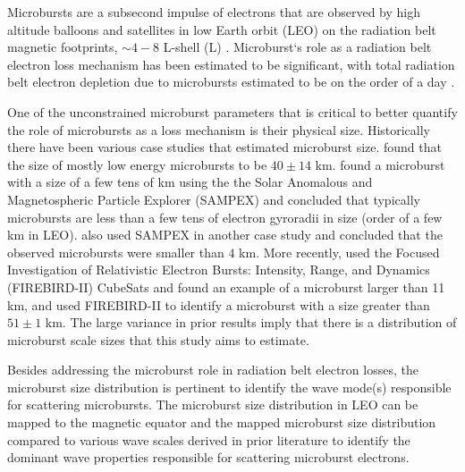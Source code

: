 \documentclass[draft]{agujournal2019}
\begin{document}
Microbursts are a subsecond impulse of electrons that are observed by high altitude balloons and satellites in low Earth orbit (LEO) on the radiation belt magnetic footprints, $\sim 4 - 8$ L-shell (L) \cite{Anderson1964, Parks1967, Lorentzen2001a, Lorentzen2001b, O'Brien2003, Woodger2015, Crew2016, Breneman2017, Mozer2018, Greeley2019}. Microburst`s role as a radiation belt electron loss mechanism has been estimated to be significant, with total radiation belt electron depletion due to microbursts estimated to be on the order of a day \cite{Lorentzen2001b, O'Brien2004, Thorne2005, Breneman2017}. 

One of the unconstrained microburst parameters that is critical to better quantify the role of microbursts as a loss mechanism is their physical size. Historically there have been various case studies that estimated microburst size.  found that the size of mostly low energy microbursts to be $40 \pm 14$ km.  found a microburst with a size of a few tens of km using the the Solar Anomalous and Magnetospheric Particle Explorer (SAMPEX) and concluded that typically microbursts are less than a few tens of electron gyroradii in size (order of a few km in LEO).  also used SAMPEX in another case study and concluded that the observed microbursts were smaller than $4$ km. More recently,  used the Focused Investigation of Relativistic Electron Bursts: Intensity, Range, and Dynamics (FIREBIRD-II) CubeSats and found an example of a microburst larger than 11 km, and  used FIREBIRD-II to identify a microburst with a size greater than $ 51 \pm 1$ km. The large variance in prior results imply that there is a distribution of microburst scale sizes that this study aims to estimate.

Besides addressing the microburst role in radiation belt electron losses, the microburst size distribution is pertinent to identify the wave mode(s) responsible for scattering microbursts. The microburst size distribution in LEO can be mapped to the magnetic equator and the mapped microburst size distribution compared to various wave scales derived in prior literature to identify the dominant wave properties responsible for scattering microburst electrons. 
\end{document}
